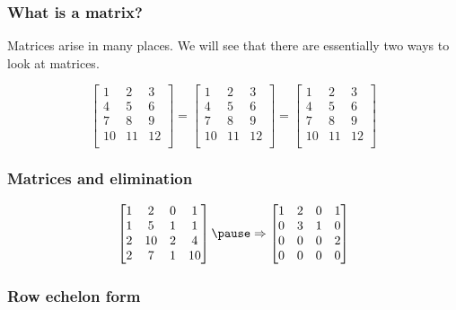 

\begin{frame}
  \frametitle{What is a matrix?}

  Matrices arise in many places.  We will see that there are
  essentially two ways to look at matrices.
  
  \[
  \left[
    \begin{array}{c|c|c}
      1 & 2 & 3 \\
      4 & 5 & 6 \\
      7 & 8 & 9 \\
      10 & 11 & 12 \\
    \end{array}
    \right]
  =
  \left[
    \begin{array}{ccc}
      1 & 2 & 3 \\
      4 & 5 & 6 \\
      7 & 8 & 9 \\
      10 & 11 & 12 \\
    \end{array}
    \right]
  =
  \left[
    \begin{array}{ccc}
      1 & 2 & 3 \\
      \hline
      4 & 5 & 6 \\
      \hline
      7 & 8 & 9 \\
      \hline
      10 & 11 & 12 \\
    \end{array}
    \right]
  \]
\end{frame}

\begin{frame}
  \frametitle{Matrices and elimination}
  \pause
  \[
  \begin{bmatrix}
    1 & 2 & 0 & 1 \\
    1 & 5 & 1 & 1 \\
    2 & 10 & 2 & 4 \\
    2 & 7 & 1 & 10
  \end{bmatrix}
  \pause \Rightarrow
  \begin{bmatrix}
    1 & 2 & 0 & 1 \\
    0 & 3 & 1 & 0 \\
    0 & 0 & 0 & 2 \\
    0 & 0 & 0 & 0
  \end{bmatrix}
  \]
\end{frame}

\begin{frame}
  \frametitle{Row echelon form}
\end{frame}

